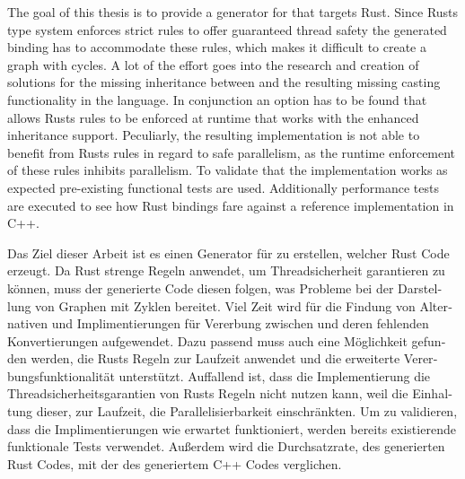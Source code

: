 \documentclass[thesis]{subfiles}
\begin{document}
{
\let\cleardoublepage\relax

The goal of this thesis is to provide a generator for  that targets Rust.
Since Rusts type system enforces strict rules to offer guaranteed thread safety the generated binding has to accommodate these rules, which makes it difficult to create a graph with cycles.
A lot of the effort goes into the research and creation of solutions for the missing inheritance between \structs and the resulting missing casting functionality in the language.
In conjunction an option has to be found that allows Rusts rules to be enforced at runtime that works with the enhanced inheritance support.
Peculiarly, the resulting implementation is not able to benefit from Rusts rules in regard to safe parallelism, as the runtime enforcement of these rules inhibits parallelism.
To validate that the implementation works as expected pre-existing functional tests are used.
Additionally performance tests are executed to see how Rust bindings fare against a reference implementation in C++.

}

\begin{otherlanguage}{ngerman}
  Das Ziel dieser Arbeit ist es einen Generator für  zu erstellen, welcher Rust Code erzeugt.
  Da Rust strenge Regeln anwendet, um Threadsicherheit garantieren zu können, muss der generierte Code diesen folgen, was Probleme bei der Darstellung von Graphen mit Zyklen bereitet.
  Viel Zeit wird für die Findung von Alternativen und Implimentierungen für Vererbung zwischen \structs und deren fehlenden Konvertierungen aufgewendet.
  Dazu passend muss auch eine Möglichkeit gefunden werden, die Rusts Regeln zur Laufzeit anwendet und die erweiterte Vererbungsfunktionalität unterstützt.
  Auffallend ist, dass die Implementierung die Threadsicherheitsgarantien von Rusts Regeln  nicht nutzen kann, weil die Einhaltung dieser, zur Laufzeit, die Parallelisierbarkeit einschränkten.
  Um zu validieren, dass die Implimentierungen wie erwartet funktioniert, werden bereits existierende funktionale Tests verwendet.
  Außerdem wird die Durchsatzrate, des generierten Rust Codes, mit der des generiertem C++ Codes verglichen.
\end{otherlanguage}
\end{document}
